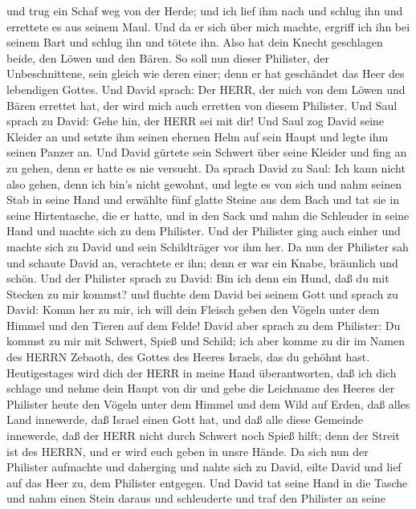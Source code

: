 und trug ein Schaf weg von der Herde;  und ich lief ihm
nach und schlug ihn und errettete es aus seinem Maul. Und da er sich
über mich machte, ergriff ich ihn bei seinem Bart und schlug ihn und
tötete ihn.  Also hat dein Knecht geschlagen beide, den
Löwen und den Bären. So soll nun dieser Philister, der Unbeschnittene,
sein gleich wie deren einer; denn er hat geschändet das Heer des
lebendigen Gottes.  Und David sprach: Der HERR, der mich
von dem Löwen und Bären errettet hat, der wird mich auch erretten von
diesem Philister.  Und Saul sprach zu David: Gehe hin, der
HERR sei mit dir! Und Saul zog David seine Kleider an und setzte ihm
seinen ehernen Helm auf sein Haupt und legte ihm seinen Panzer an.
 Und David gürtete sein Schwert über seine Kleider und fing
an zu gehen, denn er hatte es nie versucht. Da sprach David zu Saul: Ich
kann nicht also gehen, denn ich bin's nicht gewohnt, und legte es von
sich  und nahm seinen Stab in seine Hand und erwählte fünf
glatte Steine aus dem Bach und tat sie in seine Hirtentasche, die er
hatte, und in den Sack und nahm die Schleuder in seine Hand und machte
sich zu dem Philister.  Und der Philister ging auch einher
und machte sich zu David und sein Schildträger vor ihm her.
 Da nun der Philister sah und schaute David an, verachtete
er ihn; denn er war ein Knabe, bräunlich und schön.  Und
der Philister sprach zu David: Bin ich denn ein Hund, daß du mit Stecken
zu mir kommst? und fluchte dem David bei seinem Gott  und
sprach zu David: Komm her zu mir, ich will dein Fleisch geben den Vögeln
unter dem Himmel und den Tieren auf dem Felde!  David aber
sprach zu dem Philister: Du kommst zu mir mit Schwert, Spieß und Schild;
ich aber komme zu dir im Namen des HERRN Zebaoth, des Gottes des Heeres
Israels, das du gehöhnt hast.  Heutigestages wird dich der
HERR in meine Hand überantworten, daß ich dich schlage und nehme dein
Haupt von dir und gebe die Leichname des Heeres der Philister heute den
Vögeln unter dem Himmel und dem Wild auf Erden, daß alles Land
innewerde, daß Israel einen Gott hat,  und daß alle diese
Gemeinde innewerde, daß der HERR nicht durch Schwert noch Spieß hilft;
denn der Streit ist des HERRN, und er wird euch geben in unsre Hände.
 Da sich nun der Philister aufmachte und daherging und
nahte sich zu David, eilte David und lief auf das Heer zu, dem Philister
entgegen.  Und David tat seine Hand in die Tasche und nahm
einen Stein daraus und schleuderte und traf den Philister an seine
